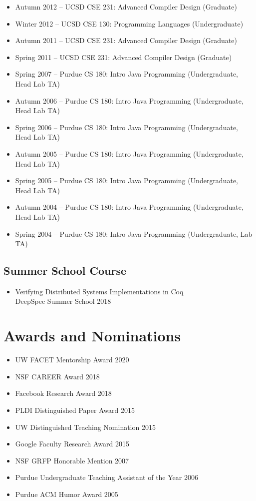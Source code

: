 \documentclass[10pt]{article}
\begin{document}
\begin{itemize}
  \item Autumn 2012 -- UCSD CSE 231: Advanced Compiler Design (Graduate)
  \item Winter 2012 -- UCSD CSE 130: Programming Languages (Undergraduate)
  \item Autumn 2011 -- UCSD CSE 231: Advanced Compiler Design (Graduate)
  \item Spring 2011 -- UCSD CSE 231: Advanced Compiler Design (Graduate)
  \item Spring 2007 -- Purdue CS 180: Intro Java Programming (Undergraduate, Head Lab TA)
  \item Autumn 2006 -- Purdue CS 180: Intro Java Programming (Undergraduate, Head Lab TA)
  \item Spring 2006 -- Purdue CS 180: Intro Java Programming (Undergraduate, Head Lab TA)
  \item Autumn 2005 -- Purdue CS 180: Intro Java Programming (Undergraduate, Head Lab TA)
  \item Spring 2005 -- Purdue CS 180: Intro Java Programming (Undergraduate, Head Lab TA)
  \item Autumn 2004 -- Purdue CS 180: Intro Java Programming (Undergraduate, Head Lab TA)
  \item Spring 2004 -- Purdue CS 180: Intro Java Programming (Undergraduate, Lab TA)
\end{itemize}

\subsection*{Summer School Course}

\begin{itemize}
  \item Verifying Distributed Systems Implementations in Coq \\
        DeepSpec Summer School 2018
\end{itemize}


\section*{Awards and Nominations}

\begin{itemize}
  \item UW FACET Mentorship Award 2020
  \item NSF CAREER Award 2018
  \item Facebook Research Award 2018
  \item PLDI Distinguished Paper Award 2015
  \item UW Distinguished Teaching Nomination 2015
  \item Google Faculty Research Award 2015
  \item NSF GRFP Honorable Mention 2007
  \item Purdue Undergraduate Teaching Assistant of the Year 2006
  \item Purdue ACM Humor Award 2005
\end{itemize}
\end{document}
